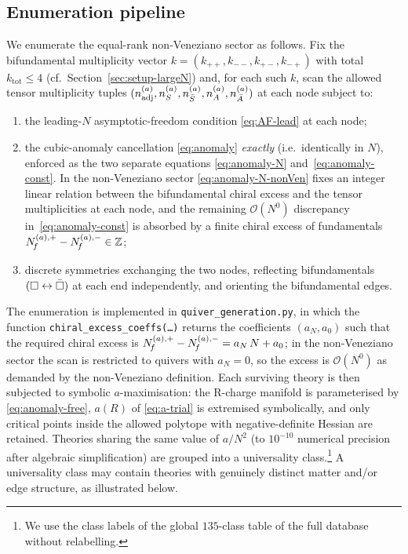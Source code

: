 
\subsection{Enumeration pipeline}
\label{sec:class-enumeration}

We enumerate the equal-rank non-Veneziano sector as follows.  Fix the
bifundamental multiplicity vector
$k=(k_{++},k_{--},k_{+-},k_{-+})$ with total
$k_{\text{tot}}\le 4$ (cf.~Section~\ref{sec:setup-largeN}) and, for
each such $k$, scan the allowed tensor multiplicity tuples
$(n_{\mathrm{adj}}^{(a)},n_{S}^{(a)},n_{\bar S}^{(a)},n_{A}^{(a)},n_{\bar A}^{(a)})$
at each node subject to:
\begin{enumerate}\setlength{\itemsep}{2pt}
  \item the leading-$N$ asymptotic-freedom condition
    \eqref{eq:AF-lead} at each node;
  \item the cubic-anomaly cancellation \eqref{eq:anomaly}
    \emph{exactly} (i.e.\ identically in $N$), enforced as the two
    separate equations \eqref{eq:anomaly-N}
    and~\eqref{eq:anomaly-const}.  In the non-Veneziano sector
    \eqref{eq:anomaly-N-nonVen} fixes an integer linear relation
    between the bifundamental chiral excess and the tensor
    multiplicities at each node, and the remaining
    $\mathcal O(N^{0})$ discrepancy in~\eqref{eq:anomaly-const} is
    absorbed by a finite chiral excess of fundamentals
    $N_{\!f}^{(a),+}-N_{\!f}^{(a),-}\in\mathbb Z$;
  \item discrete symmetries exchanging the two nodes, reflecting
    bifundamentals $(\square\leftrightarrow\bar{\square})$ at each end
    independently, and orienting the bifundamental edges.
\end{enumerate}
The enumeration is implemented in \texttt{quiver\_generation.py}, in
which the function \texttt{chiral\_excess\_coeffs(\ldots)} returns
the coefficients $(a_{N},a_{0})$ such that the required chiral
excess is $N_{\!f}^{(a),+}-N_{\!f}^{(a),-}=a_{N}\,N+a_{0}$; in the
non-Veneziano sector the scan is restricted to quivers with
$a_{N}=0$, so the excess is $\mathcal O(N^{0})$ as demanded by the
non-Veneziano definition.
Each surviving theory is then subjected to symbolic
$a$-maximisation: the R-charge manifold is parameterised by
\eqref{eq:anomaly-free}, $a(R)$ of \eqref{eq:a-trial} is extremised
symbolically, and only critical points inside the allowed polytope
with negative-definite Hessian are retained.  Theories sharing the
same value of $a/N^{2}$ (to $10^{-10}$ numerical precision after
algebraic simplification) are grouped into a universality
class.\footnote{We use the class labels of the global $135$-class
table of the full database without relabelling.}  A universality class
may contain theories with genuinely distinct matter and/or edge
structure, as illustrated below.

